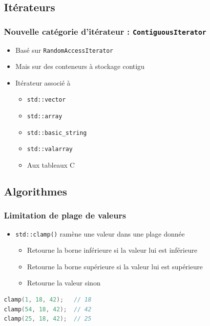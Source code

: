 \documentclass[C++.tex]{subfiles}
\begin{document}
\subsection*{Itérateurs}
\begin{frame}
	\frametitle{Nouvelle catégorie d'itérateur : \lstinline|ContiguousIterator|}
	\begin{itemize}
		\item Basé sur \lstinline|RandomAccessIterator|
		\item Mais sur des conteneurs \og à stockage contigu\fg{}
		\item Itérateur associé à 
		\begin{itemize}
			\item \lstinline|std::vector|
			\item \lstinline|std::array|
			\item \lstinline|std::basic_string|
			\item \lstinline|std::valarray|
			\item Aux tableaux C
		\end{itemize}
	\end{itemize}

\end{frame}

\subsection*{Algorithmes}
\begin{frame}[fragile]
	\frametitle{Limitation de plage de valeurs}
	\begin{itemize}
		\item \lstinline|std::clamp()| ramène une valeur dans une plage donnée
		\begin{itemize}
			\item Retourne la borne inférieure si la valeur lui est inférieure
			\item Retourne la borne supérieure si la valeur lui est supérieure
			\item Retourne la valeur sinon
		\end{itemize}
	\end{itemize}

	\begin{lstlisting}[language=C++]
clamp(1, 18, 42);   // 18
clamp(54, 18, 42);  // 42
clamp(25, 18, 42);  // 25\end{lstlisting}
\end{frame}
\end{document}
